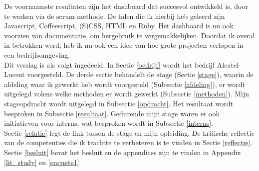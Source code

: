 \documentclass[10pt,a4paper]{article}
\begin{document}
De voornaamste resultaten zijn het dashboard dat succesvol ontwikkeld is, door te werken via de scrum-methode. De talen die ik hierbij heb geleerd zijn Javascript, Coffeescript, (S)CSS, HTML en Ruby. Het dashboard is nu ook voorzien van documentatie, om hergebruik te vergemakkelijken. Doordat ik overal in betrokken werd, heb ik nu ook een idee van hoe grote projecten verlopen in een bedrijfsomgeving.\\

Dit verslag is als volgt ingedeeld. In Sectie \ref{bedrijf} wordt het bedrijf Alcatel-Lucent voorgesteld. De derde sectie behandelt de stage (Sectie \ref{stage}), waarin de afdeling waar ik gewerkt heb wordt voorgesteld (Subsectie \ref{afdeling}), er wordt uitgelegd volens welke methoden er wordt gewerkt (Subsectie \ref{methoden}). Mijn stageopdracht wordt uitgelegd in Subsectie \ref{opdracht}. Het resultaat wordt besproken in Subsectie \ref{resultaat}. Gedurende mijn stage waren er ook initiatieven voor interns, wat besproken wordt in Subsectie \ref{interns}.\\
Sectie \ref{relatie} legt de link tussen de stage en mijn opleiding. De kritische reflectie van de competenties die ik trachtte te verbeteren is te vinden in Sectie \ref{reflectie}. Sectie \ref{besluit} bevat het besluit en de appendices zijn te vinden in Appendix \ref{lit_study} en \ref{enquete1}. 
\end{document}
